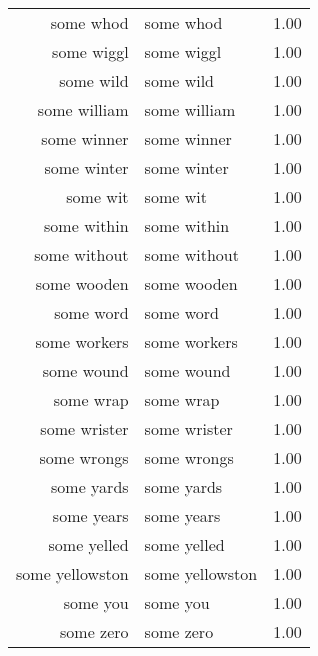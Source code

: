 \begin{table}[ht]
\begin{tabular}{rlr}
  some whod & some whod & 1.00 \\ 
  some wiggl & some wiggl & 1.00 \\ 
  some wild & some wild & 1.00 \\ 
  some william & some william & 1.00 \\ 
  some winner & some winner & 1.00 \\ 
  some winter & some winter & 1.00 \\ 
  some wit & some wit & 1.00 \\ 
  some within & some within & 1.00 \\ 
  some without & some without & 1.00 \\ 
  some wooden & some wooden & 1.00 \\ 
  some word & some word & 1.00 \\ 
  some workers & some workers & 1.00 \\ 
  some wound & some wound & 1.00 \\ 
  some wrap & some wrap & 1.00 \\ 
  some wrister & some wrister & 1.00 \\ 
  some wrongs & some wrongs & 1.00 \\ 
  some yards & some yards & 1.00 \\ 
  some years & some years & 1.00 \\ 
  some yelled & some yelled & 1.00 \\ 
  some yellowston & some yellowston & 1.00 \\ 
  some you & some you & 1.00 \\ 
  some zero & some zero & 1.00 \\ 
   \hline
\end{tabular}
\end{table}
